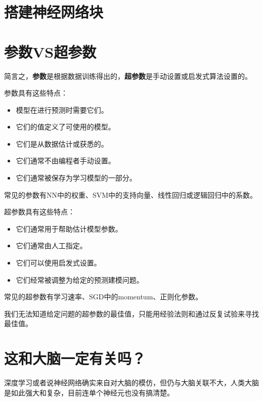 \documentclass[../../main.tex]{subfiles}
\begin{document}
\section{搭建神经网络块}

\section{参数VS超参数}
简言之，\textbf{参数}是根据数据训练得出的，\textbf{超参数}是手动设置或启发式算法设置的。

参数具有这些特点：
\begin{itemize}
    \item 模型在进行预测时需要它们。
    \item 它们的值定义了可使用的模型。
    \item 它们是从数据估计或获悉的。
    \item 它们通常不由编程者手动设置。
    \item 它们通常被保存为学习模型的一部分。
\end{itemize}
常见的参数有NN中的权重、SVM中的支持向量、线性回归或逻辑回归中的系数。

超参数具有这些特点：
\begin{itemize}
    \item 它们通常用于帮助估计模型参数。
    \item 它们通常由人工指定。
    \item 它们可以使用启发式设置。
    \item 它们经常被调整为给定的预测建模问题。
\end{itemize}
常见的超参数有学习速率、SGD中的momentum、正则化参数。

我们无法知道给定问题的超参数的最佳值，只能用经验法则和通过反复试验来寻找最佳值。

\section{这和大脑一定有关吗？}
深度学习或者说神经网络确实来自对大脑的模仿，但仍与大脑关联不大，人类大脑是如此强大和复杂，目前连单个神经元也没有搞清楚。
\end{document}
